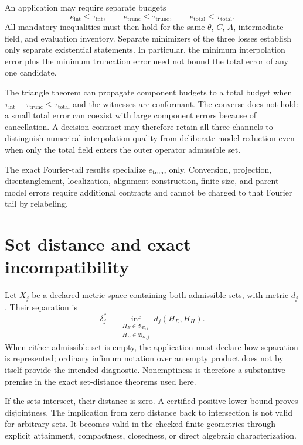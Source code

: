 An application may require separate budgets
\[
  e_{\mathrm{int}}\leq\tau_{\mathrm{int}},\qquad
  e_{\mathrm{trunc}}\leq\tau_{\mathrm{trunc}},\qquad
  e_{\mathrm{total}}\leq\tau_{\mathrm{total}}.
\]
All mandatory inequalities must then hold for the same $\theta$, $C$, $A$, intermediate
field, and evaluation inventory.  Separate minimizers of the three losses establish
only separate existential statements.  In particular, the minimum interpolation error
plus the minimum truncation error need not bound the total error of any one candidate.

The triangle theorem can propagate component budgets to a total budget when
$\tau_{\mathrm{int}}+\tau_{\mathrm{trunc}}\leq\tau_{\mathrm{total}}$ and the witnesses
are conformant.  The converse does not hold: a small total error can coexist with large
component errors because of cancellation.  A decision contract may therefore retain
all three channels to distinguish numerical interpolation quality from deliberate
model reduction even when only the total field enters the outer operator admissible
set.

The exact Fourier-tail results specialize $e_{\mathrm{trunc}}$ only.  Conversion,
projection, disentanglement, localization, alignment construction, finite-size, and
parent-model errors require additional contracts and cannot be charged to that Fourier
tail by relabeling.

\section{Set distance and exact incompatibility}

Let $X_j$ be a declared metric space containing both admissible sets, with metric
$d_j$.  Their separation is
\[
  \delta_j^*
  =\inf_{\substack{H_E\in\mathfrak A_{E,j}\\
                    H_H\in\mathfrak A_{H,j}}}
     d_j(H_E,H_H).
\]
When either admissible set is empty, the application must declare how separation is
represented; ordinary infimum notation over an empty product does not by itself provide
the intended diagnostic.  Nonemptiness is therefore a substantive premise in the exact
set-distance theorems used here.

If the sets intersect, their distance is zero.  A certified positive lower bound proves
disjointness.  The implication from zero distance back to intersection is not valid for
arbitrary sets.  It becomes valid in the checked finite geometries through explicit
attainment, compactness, closedness, or direct algebraic characterization.

